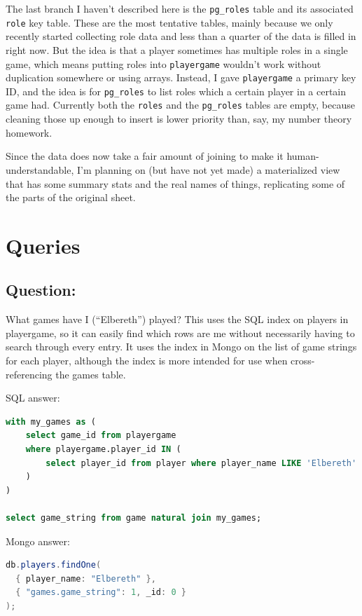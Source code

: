 \documentclass[11pt, oneside]{amsart}   	%
\begin{document}
The last branch I haven't described here is the \texttt{pg\_roles} table and its associated \texttt{role} key table. These are the most tentative tables, mainly because we only recently started collecting role data and less than a quarter of the data is filled in right now. But the idea is that a player sometimes has multiple roles in a single game, which means putting roles into \texttt{playergame} wouldn't work without duplication somewhere or using arrays. Instead, I gave \texttt{playergame} a primary key ID, and the idea is for \texttt{pg\_roles} to list roles which a certain player in a certain game had. Currently both the \texttt{roles} and the \texttt{pg\_roles} tables are empty, because cleaning those up enough to insert is lower priority than, say, my number theory homework. 

Since the data does now take a fair amount of joining to make it human-understandable, I'm planning on (but have not yet made) a materialized view that has some summary stats and the real names of things, replicating some of the parts of the original sheet. 


\section{Queries}

\subsection{Question:} What games have I (``Elbereth'') played? 
This uses the SQL index on players in playergame, so it can easily find which rows are me without necessarily having to search through every entry. It uses the index in Mongo on the list of game strings for each player, although the index is more intended for use when cross-referencing the games table. 

SQL answer: 
\begin{lstlisting}[language=SQL]
with my_games as (
    select game_id from playergame 
    where playergame.player_id IN (
        select player_id from player where player_name LIKE 'Elbereth'
    )
)
    
select game_string from game natural join my_games;
\end{lstlisting}
    
Mongo answer:
\begin{lstlisting}[language=java]
db.players.findOne(
  { player_name: "Elbereth" },
  { "games.game_string": 1, _id: 0 }
);
\end{lstlisting}
\end{document}
